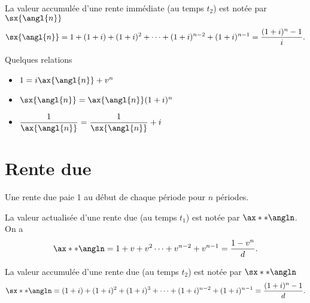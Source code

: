 La valeur accumulée d'une rente immédiate (au temps \textcolor{dlblue}{$t_2$}) est notée par $\sx{\angl{n}}$
$$\sx{\angl{n}} = 1 + (1+i) + (1+i)^2+ \dots + (1 + i)^{n-2} + (1+i)^{n-1} = \frac{(1+i)^n - 1}{i}.$$

Quelques relations 
\begin{multicols}{3}
	\begin{itemize}
		\item $1 = i\ax{\angl{n}} + v^n$
		\item $\sx{\angl{n}} = \ax{\angl{n}} (1+i)^n$
		\item $\displaystyle \frac{1}{\ax{\angl{n}}} = \frac{1}{\sx{\angl{n}}} + i$
	\end{itemize}
\end{multicols}

\section{Rente due}

Une rente due paie 1 au début de chaque période pour $n$ périodes. 

\begin{center}
\end{center}

La valeur actualisée d'une rente due (au temps \textcolor{dlblue}{$t_1$}) est notée par $\ax**{\angln}$. On a 
$$\ax**{\angln} = 1 + v + v^2 \dots + v^{n-2} + v^{n-1} = \frac{1 - v^n}{d}.$$

La valeur accumulée d'une rente due (au temps \textcolor{dlblue}{$t_2$}) est notée par $\sx**{\angln}$
$$\sx**{\angln} = (1+i) + (1+i)^2 + (1+i)^3 + \dots + (1+i)^{n-2} + (1+i)^{n-1} = \frac{(1+i)^n - 1}{d}.$$

